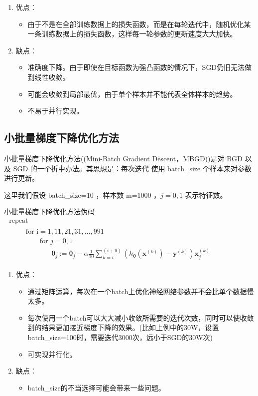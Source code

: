 \documentclass[UTF-8]{progbookcn}
\begin{document}
\begin{enumerate}
  \item 优点：
\begin{itemize}
  \item 由于不是在全部训练数据上的损失函数，而是在每轮迭代中，随机优化某一条训练数据上的损失函数，这样每一轮参数的更新速度大大加快。
\end{itemize}
  \item 缺点：
\begin{itemize}
  \item 准确度下降。由于即使在目标函数为强凸函数的情况下，SGD仍旧无法做到线性收敛。
  \item 可能会收敛到局部最优，由于单个样本并不能代表全体样本的趋势。
  \item 不易于并行实现。
\end{itemize}
\end{enumerate}




\subsection{小批量梯度下降优化方法}
小批量梯度下降优化方法((Mini-Batch Gradient Descent，MBGD))是对 BGD 以及 SGD 的一个折中办法。其思想是：每次迭代 使用 batch\_size 个样本来对参数进行更新。

这里我们假设 batch\_size=10 ，样本数 m=1000 ，$j=0,1$ 表示特征数。


\begin{titledbox}{小批量梯度下降优化方法伪码}
$\begin{array}{l}{\text { repeat }}\\ {\qquad \begin{array}{l}{\text { for } \mathrm{i}=1,11,21,31, \ldots, 991}\\{ \qquad\text { for }j=0,1}\\ {\qquad\qquad\bm{\theta}_{j}:=\bm{\theta}_{j}-\alpha \frac{1}{10} \sum_{k=i}^{(i+9)}\left(h_{\bm{\theta}}\left(\bm{x}^{(k)}\right)-\bm{y}^{(k)}\right) \bm{x}_{j}^{(k)}} \end{array}}\end{array}$
\end{titledbox}



\begin{enumerate}
  \item 优点：
\begin{itemize}
  \item 通过矩阵运算，每次在一个batch上优化神经网络参数并不会比单个数据慢太多。
  \item 每次使用一个batch可以大大减小收敛所需要的迭代次数，同时可以使收敛到的结果更加接近梯度下降的效果。(比如上例中的30W，设置batch\_size=100时，需要迭代3000次，远小于SGD的30W次)
  \item 可实现并行化。
\end{itemize}
  \item 缺点：
\begin{itemize}
  \item batch\_size的不当选择可能会带来一些问题。

\end{itemize}
\end{enumerate}
\end{document}

